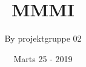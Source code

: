 \title{MMMI}
\author{By projektgruppe 02 }
\date{Marts 25 - 2019}
\pagestyle{fancy}






\begin{titlepage}

\clearpage
\maketitle
\thispagestyle{empty}









\end{titlepage}
